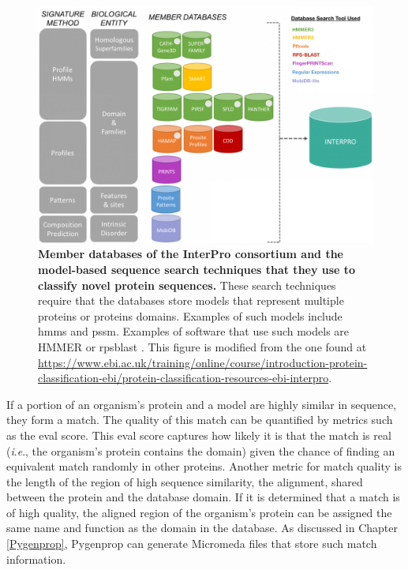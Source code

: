 \begin{figure}[!ht]
  \centering
	\includegraphics[width=\textwidth]{media/InterPro.png}
	 \caption[Member databases of the InterPro consortium and the model-based 
sequence search techniques that they use to classify novel protein 
sequences.]{\textbf{Member databases of the InterPro consortium and the 
model-based sequence search techniques that they use to classify novel protein 
sequences.} These search techniques require that the databases store models that 
represent multiple proteins or proteins domains. Examples of such models include 
\gls{hmm}s and \gls{pssm}. Examples of software that use such models are HMMER 
\cite{eddy2011accelerated} or \gls{rpsblast} \cite{mcginnis2004blast}. This 
figure is modified from the one found at 
\href{https://www.ebi.ac.uk/training/online/course/introduction-protein-classification-ebi/protein-classification-resources-ebi-interpro}{https://www.ebi.ac.uk/training/online/course/introduction-protein-classification-ebi/protein-classification-resources-ebi-interpro}.}
	 \label{fig:interpro-databases}
\end{figure}

If a portion of an organism's protein and a model are highly similar in 
sequence, they form a match. The quality of this match can be quantified by 
metrics such as the \gls{eval} score. This \gls{eval} score captures how likely 
it is that the match is real (\textit{i}.\textit{e}., the organism's protein contains the 
domain) given the chance of finding an equivalent match randomly in other 
proteins. Another metric for match quality is the length of the region of high 
sequence similarity, the alignment, shared between the protein and the database 
domain. If it is determined that a match is of high quality, the aligned region 
of the organism's protein can be assigned the same name and function as the 
domain in the database.  As discussed in Chapter \ref{Pygenprop}, Pygenprop can 
generate Micromeda files that store such match information.

